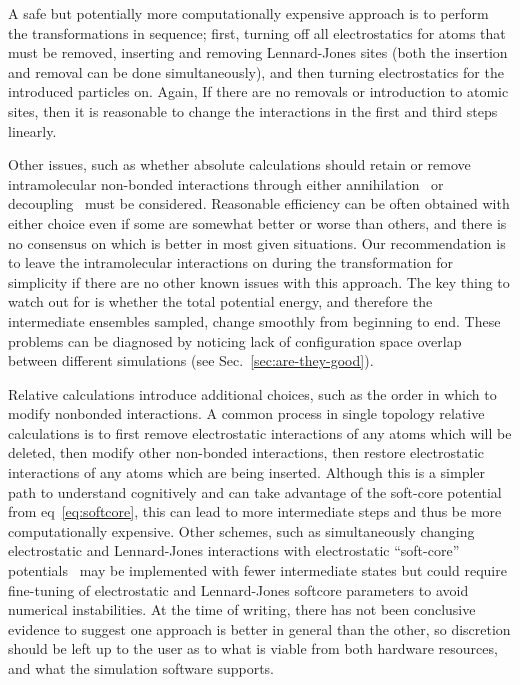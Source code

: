 \documentclass[9pt,bestpractices]{livecoms}
\begin{document}
A safe but potentially more computationally expensive approach is to perform the transformations in sequence; first, turning off all electrostatics for atoms that must be removed, inserting and removing Lennard-Jones sites (both the insertion and removal can be done simultaneously), and then turning electrostatics for the introduced particles on. Again, If there are no removals or introduction to atomic sites, then it is reasonable to change the interactions in the first and third steps  linearly. 

Other issues, such as whether absolute calculations should retain or remove intramolecular non-bonded interactions
through either annihilation~\cite{hermans1997inclusiona, mann2000modelinga, boresch2003absolutea, wang2006absolutea, mobley2006use} or decoupling~\cite{fujitani2005directa, mobley2006use} must be considered. Reasonable efficiency can be often obtained with either choice even if some are somewhat better or worse than others, and there is no consensus on which is better in most given situations. Our recommendation is to leave the intramolecular interactions on during the transformation for simplicity if there are no other known issues with this approach. The key thing to watch out for is whether the total potential energy, and therefore the intermediate ensembles sampled, change smoothly from beginning to end. These problems can be diagnosed by noticing lack of configuration space overlap between different simulations (see Sec.~\ref{sec:are-they-good}).

Relative calculations introduce additional choices, such as the order in which to modify nonbonded interactions.
A common process in single topology relative calculations is to first remove electrostatic interactions of any atoms which will be deleted, then modify other non-bonded interactions, then restore electrostatic interactions of any atoms which are being inserted. Although this is a simpler path to understand cognitively and can take advantage of the soft-core potential from eq~\ref{eq:softcore}, this can lead to more intermediate steps and thus be more computationally expensive.
Other schemes, such as simultaneously changing electrostatic and Lennard-Jones interactions with electrostatic ``soft-core'' potentials~\cite{steinbrecher2007nonlinear} may be implemented with fewer intermediate states but could require fine-tuning of electrostatic and Lennard-Jones softcore parameters to avoid numerical instabilities. 
At the time of writing, there has not been conclusive evidence to suggest one approach is better in general than the other, so discretion should be left up to the user as to what is viable from both hardware resources, and what the simulation software supports.
\end{document}
